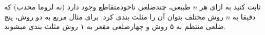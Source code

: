 ثابت کنید به ازای هر $n$ طبیعی، چندضلعی ناخودمتقاطع وجود دارد (نه لزوما محدب) که دقیقا 
به $n$ روش مختلف بتوان آن را مثلث بندی کرد. برای مثال مربع به دو روش،
پنج ضلعی منتظم به ۵ روش و چهارضلعی مقعر به ۱ روش مثلث بندی میشوند.